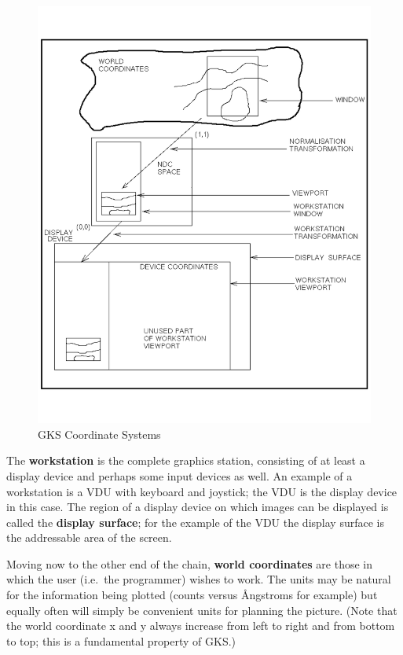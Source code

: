 \documentclass[11pt]{starlink}
\begin{document}
\begin{figure}
   \includegraphics[scale=.8]{sun85_diag1}
   \caption{GKS Coordinate Systems}
\end{figure}

The \textbf{workstation} is the complete
graphics station,
consisting of at least a display device and perhaps some input
devices as well.  An example of a workstation is a VDU with keyboard
and joystick;  the VDU is the display device in this case.  The
region of a display device on which images can be displayed
is called the \textbf{display surface};  for
the example of the VDU the display surface is the addressable
area of the screen.

Moving now to the other end of the chain,
\textbf{world coordinates} are those in which the user (i.e.\ the
programmer) wishes to work.  The units may be natural
for the information being plotted (counts versus \AA ngstroms
for example)
but equally often will simply be convenient units
for planning the picture.  (Note that the world coordinate x and y
always increase from left to right and from bottom to top;  this is a
fundamental property of GKS.)
\end{document}
